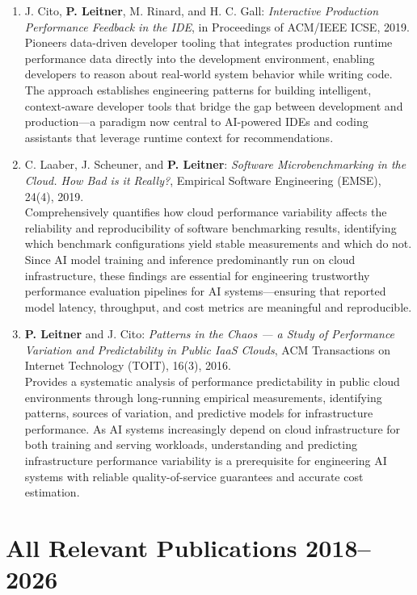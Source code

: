 \documentclass[a4paper,11pt]{article}
\begin{document}
\begin{enumerate}[leftmargin=2em,itemsep=0.7em]
\item J. Cito, \textbf{P. Leitner}, M. Rinard, and H. C. Gall: \emph{Interactive Production Performance Feedback in the IDE}, in Proceedings of ACM/IEEE ICSE, 2019.\\
{\small Pioneers data-driven developer tooling that integrates production runtime performance data directly into the development environment, enabling developers to reason about real-world system behavior while writing code. The approach establishes engineering patterns for building intelligent, context-aware developer tools that bridge the gap between development and production---a paradigm now central to AI-powered IDEs and coding assistants that leverage runtime context for recommendations.}

\item C. Laaber, J. Scheuner, and \textbf{P. Leitner}: \emph{Software Microbenchmarking in the Cloud. How Bad is it Really?}, Empirical Software Engineering (EMSE), 24(4), 2019.\\
{\small Comprehensively quantifies how cloud performance variability affects the reliability and reproducibility of software benchmarking results, identifying which benchmark configurations yield stable measurements and which do not. Since AI model training and inference predominantly run on cloud infrastructure, these findings are essential for engineering trustworthy performance evaluation pipelines for AI systems---ensuring that reported model latency, throughput, and cost metrics are meaningful and reproducible.}

\item \textbf{P. Leitner} and J. Cito: \emph{Patterns in the Chaos --- a Study of Performance Variation and Predictability in Public IaaS Clouds}, ACM Transactions on Internet Technology (TOIT), 16(3), 2016.\\
{\small Provides a systematic analysis of performance predictability in public cloud environments through long-running empirical measurements, identifying patterns, sources of variation, and predictive models for infrastructure performance. As AI systems increasingly depend on cloud infrastructure for both training and serving workloads, understanding and predicting infrastructure performance variability is a prerequisite for engineering AI systems with reliable quality-of-service guarantees and accurate cost estimation.}

\end{enumerate}

\section{All Relevant Publications 2018--2026}
\end{document}
